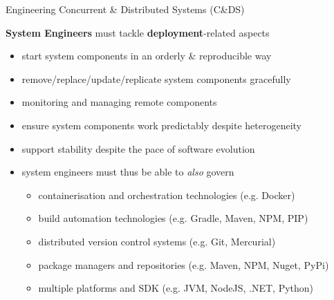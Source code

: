 \documentclass[presentation]{beamer}\mode<presentation>{\usetheme{AMSBolognaFC}}
\begin{document}
\begin{frame}[c,allowframebreaks]{Engineering Concurrent \& Distributed Systems (C\&DS)}
    \begin{block}{\textbf{System Engineers} must tackle \textbf{deployment}-related aspects}
        \begin{itemize}
            \item start system components in an \alert{orderly \& reproducible} way
            \item remove/replace/update/replicate system components \alert{gracefully}
            \item \alert{monitoring} and managing remote components
            \item ensure system components work \alert{predictably} despite heterogeneity
            \item support \alert{stability} despite the pace of software \alert{evolution}
        \end{itemize}
    \end{block}

    \begin{itemize}
        \item system engineers must thus be able to \emph{also} govern
        \begin{itemize}
            \item containerisation and orchestration technologies (e.g. Docker)
            \item build automation technologies (e.g. Gradle, Maven, NPM, PIP)
            \item distributed version control systems (e.g. Git, Mercurial)
            \item package managers and repositories (e.g. Maven, NPM, Nuget, PyPi)
            \item multiple platforms and SDK (e.g. JVM, NodeJS, .NET, Python)
        \end{itemize}
    \end{itemize}

\end{frame}
\end{document}
